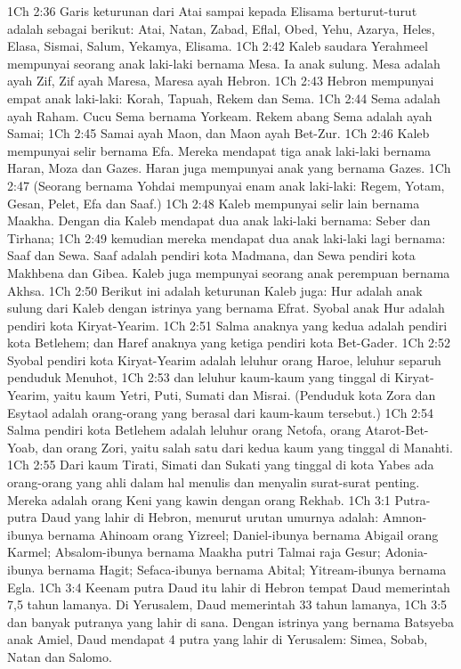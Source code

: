 1Ch 2:36  Garis keturunan dari Atai sampai kepada Elisama berturut-turut adalah sebagai berikut: Atai, Natan, Zabad, Eflal, Obed, Yehu, Azarya, Heles, Elasa, Sismai, Salum, Yekamya, Elisama.
1Ch 2:42  Kaleb saudara Yerahmeel mempunyai seorang anak laki-laki bernama Mesa. Ia anak sulung. Mesa adalah ayah Zif, Zif ayah Maresa, Maresa ayah Hebron.
1Ch 2:43  Hebron mempunyai empat anak laki-laki: Korah, Tapuah, Rekem dan Sema.
1Ch 2:44  Sema adalah ayah Raham. Cucu Sema bernama Yorkeam. Rekem abang Sema adalah ayah Samai;
1Ch 2:45  Samai ayah Maon, dan Maon ayah Bet-Zur.
1Ch 2:46  Kaleb mempunyai selir bernama Efa. Mereka mendapat tiga anak laki-laki bernama Haran, Moza dan Gazes. Haran juga mempunyai anak yang bernama Gazes.
1Ch 2:47  (Seorang bernama Yohdai mempunyai enam anak laki-laki: Regem, Yotam, Gesan, Pelet, Efa dan Saaf.)
1Ch 2:48  Kaleb mempunyai selir lain bernama Maakha. Dengan dia Kaleb mendapat dua anak laki-laki bernama: Seber dan Tirhana;
1Ch 2:49  kemudian mereka mendapat dua anak laki-laki lagi bernama: Saaf dan Sewa. Saaf adalah pendiri kota Madmana, dan Sewa pendiri kota Makhbena dan Gibea. Kaleb juga mempunyai seorang anak perempuan bernama Akhsa.
1Ch 2:50  Berikut ini adalah keturunan Kaleb juga: Hur adalah anak sulung dari Kaleb dengan istrinya yang bernama Efrat. Syobal anak Hur adalah pendiri kota Kiryat-Yearim.
1Ch 2:51  Salma anaknya yang kedua adalah pendiri kota Betlehem; dan Haref anaknya yang ketiga pendiri kota Bet-Gader.
1Ch 2:52  Syobal pendiri kota Kiryat-Yearim adalah leluhur orang Haroe, leluhur separuh penduduk Menuhot,
1Ch 2:53  dan leluhur kaum-kaum yang tinggal di Kiryat-Yearim, yaitu kaum Yetri, Puti, Sumati dan Misrai. (Penduduk kota Zora dan Esytaol adalah orang-orang yang berasal dari kaum-kaum tersebut.)
1Ch 2:54  Salma pendiri kota Betlehem adalah leluhur orang Netofa, orang Atarot-Bet-Yoab, dan orang Zori, yaitu salah satu dari kedua kaum yang tinggal di Manahti.
1Ch 2:55  Dari kaum Tirati, Simati dan Sukati yang tinggal di kota Yabes ada orang-orang yang ahli dalam hal menulis dan menyalin surat-surat penting. Mereka adalah orang Keni yang kawin dengan orang Rekhab.
1Ch 3:1  Putra-putra Daud yang lahir di Hebron, menurut urutan umurnya adalah: Amnon-ibunya bernama Ahinoam orang Yizreel; Daniel-ibunya bernama Abigail orang Karmel; Absalom-ibunya bernama Maakha putri Talmai raja Gesur; Adonia-ibunya bernama Hagit; Sefaca-ibunya bernama Abital; Yitream-ibunya bernama Egla.
1Ch 3:4  Keenam putra Daud itu lahir di Hebron tempat Daud memerintah 7,5 tahun lamanya. Di Yerusalem, Daud memerintah 33 tahun lamanya,
1Ch 3:5  dan banyak putranya yang lahir di sana. Dengan istrinya yang bernama Batsyeba anak Amiel, Daud mendapat 4 putra yang lahir di Yerusalem: Simea, Sobab, Natan dan Salomo.
